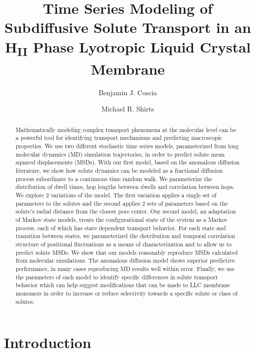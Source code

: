 \documentclass{article}
\title{Time Series Modeling of Subdiffusive Solute Transport in an H\textsubscript{II}
 Phase Lyotropic Liquid Crystal Membrane}
\author{Benjamin J. Coscia \and Michael R. Shirts}
\begin{document}
  \graphicspath{{./figures/}}
  \maketitle
  
  \begin{abstract}
  Mathematically modeling complex transport phenomena at the molecular level 
  can be a powerful tool for identifying transport mechanisms and predicting
  macroscopic properties. We use two different stochastic time series models,
  parameterized from long molecular dynamics (MD) simulation trajectories, in order
  to predict solute mean squared displacements (MSDs). With our first model, based
  on the anomalous diffusion literature, we show how solute dynamics can be modeled as
  a fractional diffusion process subordinate to a continuous time random walk.
  We parameterize the distribution of dwell times, hop lengths between dwells and
  correlation between hops. We explore 2 variations of the model. The first variation
  applies a single set of parameters to the solutes and the second applies 2 sets
  of parameters based on the solute's radial distance from the closest pore center.
  Our second model, an adaptation of Markov state models, treats the configurational
  state of the system as a Markov process, each of which has state dependent 
  transport behavior. For each state and transition between states, we parameterized
  the distribution and temporal correlation structure of positional fluctuations as
  a means of characterization and to allow us to predict solute MSDs.
  We show that our models reasonably reproduce MSDs calculated from molecular 
  simulations. The anomalous diffusion model shows superior predictive performance, 
  in many cases reproducing MD results well within error. Finally, we use the 
  parameters of each model to identify specific differences in solute transport
  behavior which can help suggest modifications that can be made to LLC membrane 
  monomers in order to increase or reduce selectivity towards a specific solute
  or class of solutes.

  \end{abstract}

  \section{Introduction}
  
\end{document}
